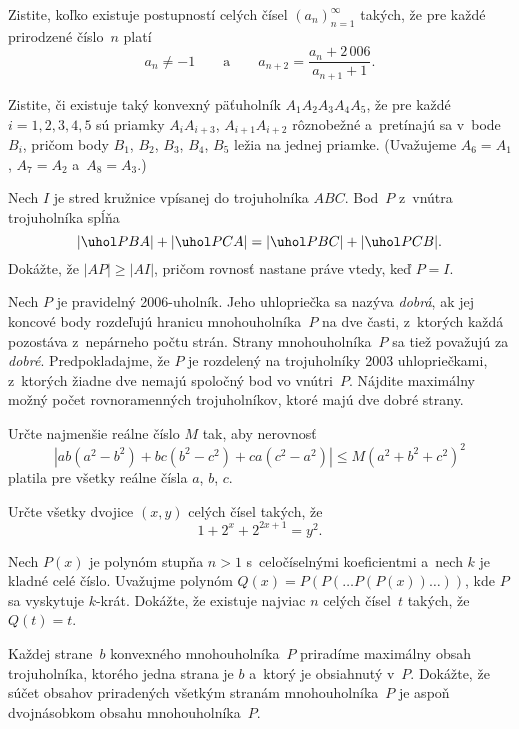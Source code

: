 {%
Zistite, koľko existuje postupností celých čísel $(a_n)_{n=1}^\infty$ takých, že pre každé prirodzené číslo~$n$ platí
$$
a_n\ne-1
\qquad
\text{a}
\qquad
a_{n+2}=\frac{a_n+2\,006}{a_{n+1}+1}.
$$}

{%
Zistite, či existuje taký konvexný päťuholník $A_1A_2A_3A_4A_5$, že pre každé $i=1,2,3,4,5$  sú priamky
$A_iA_{i+3}$, $A_{i+1}A_{i+2}$ rôznobežné a~pretínajú sa v~bode~$B_i$, pričom body $B_1$, $B_2$, $B_3$, $B_4$, $B_5$
ležia na jednej priamke. (Uvažujeme $A_6=A_1$, $A_7=A_2$ a~$A_8=A_3$.)}

{%
Nech $I$ je stred kružnice vpísanej do trojuholníka $ABC$. Bod~$P$
z~vnútra trojuholníka spĺňa
$$
|\uhol PBA|+|\uhol PCA|=|\uhol PBC|+|\uhol PCB|.
$$
Dokážte, že ${|AP|\ge |AI|}$, pričom rovnosť nastane práve vtedy, keď $P=I$.}

{%
Nech $P$ je pravidelný 2006-uholník. Jeho uhlopriečka sa nazýva {\it dobrá}, ak jej koncové
body rozdeľujú hranicu mnohouholníka~$P$ na dve časti, z~ktorých každá pozostáva z~nepárneho
počtu strán. Strany mnohouholníka~$P$ sa tiež považujú za {\it dobré}.
Predpokladajme, že $P$ je rozdelený na trojuholníky 2003 uhlopriečkami,
z~ktorých žiadne dve nemajú spoločný bod vo vnútri~$P$. Nájdite
maximálny možný počet rovnoramenných trojuholníkov, ktoré majú dve dobré strany.}

{%
Určte najmenšie reálne číslo $M$ tak, aby nerovnosť
$$
|ab(a^2-b^2)+bc(b^2-c^2)+ca(c^2-a^2)| \le M(a^2+b^2+c^2)^2
$$
platila pre všetky reálne čísla $a$, $b$, $c$.}

{%
Určte všetky dvojice $(x,y)$ celých čísel takých, že
$$
1+2^{x}+2^{2x+1}=y^2.
$$}

{%
Nech $P(x)$ je polynóm stupňa ${n>1}$ s~celočíselnými koeficientmi 
a~nech $k$ je kladné celé číslo. Uvažujme polynóm $Q(x)=P(P(\dots P(P(x))\dots))$,
kde $P$ sa vyskytuje $k$-krát. Dokážte, že existuje najviac $n$ celých čísel~$t$ takých,
že $Q(t) = t$.}

{%
Každej strane~$b$ konvexného mnohouholníka~$P$ priradíme maximálny obsah 
trojuholníka, ktorého jedna strana je $b$ a~ktorý je obsiahnutý v~$P$.
Dokážte, že súčet obsahov priradených všetkým stranám mnohouholníka~$P$ je aspoň dvojnásobkom
obsahu mnohouholníka~$P$.}


